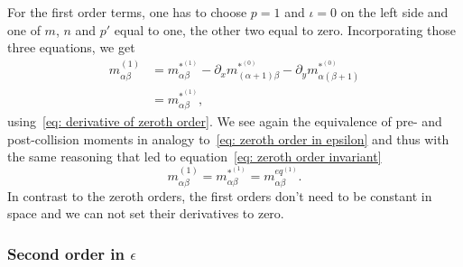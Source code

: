 For the first order terms, one has to choose $p=1$ and $\iota=0$ on the left side and one of $m$, $n$ and $p'$ equal to one, the other two equal to zero.
Incorporating those three equations, we get
\begin{equation}
  \label{eq: first order in epsilon}
  \begin{aligned}
  m_{\alpha\beta}^{(1)}
  & = m_{\alpha\beta}^{*^{(1)}}
  - \partial_x m_{(\alpha+1)\beta}^{*^{(0)}} - \partial_y m_{\alpha(\beta+1)}^{*^{(0)}} \\
  & = m_{\alpha\beta}^{*^{(1)}},
  \end{aligned}
\end{equation}
using~\eqref{eq: derivative of zeroth order}.
We see again the equivalence of pre- and post-collision moments in analogy to~\eqref{eq: zeroth order in epsilon} and thus with the same reasoning that led to equation~\eqref{eq: zeroth order invariant}
\begin{equation}
  \label{eq: first order invariant}
  m_{\alpha\beta}^{(1)} = m_{\alpha\beta}^{*^{(1)}} = m_{\alpha\beta}^{eq^{(1)}}.
\end{equation}
In contrast to the zeroth orders, the first orders don't need to be constant in space and we can not set their derivatives to zero.

\subsubsection{Second order in \texorpdfstring{$\epsilon$}{epsilon}}
\label{subs: Second order in epsilon}

